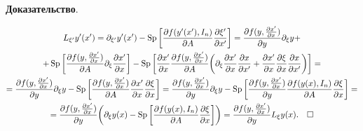 {\bf Доказательство}.


\begin{gather*}


L_{\xi'}y'(x')=\partial_{\xi'}y'(x')-


\SP\bigg[\frac{\partial f(y'(x'),I_n)}{\partial A}


\frac{\partial \xi'}{\partial x'}\bigg] =


\frac{\partial f(y,\frac{\partial x'}{\partial x})}{\partial y}


\partial_\xi y+ \\


%


+\SP\bigg[\frac{\partial f(y,\frac{\partial x'}{\partial x})}{\partial A}


\partial_\xi\frac{\partial x'}{\partial x}\bigg]-


\SP\bigg[ \frac{\partial x'}{\partial x}


\frac{\partial f(y,\frac{\partial x'}{\partial x})}{\partial A}


\bigg(\partial_\xi\frac{\partial x'}{\partial x}


\frac{\partial x}{\partial x'}+\frac{\partial x'}{\partial x}


\frac{\partial\xi}{\partial x}\frac{\partial x}{\partial x'}\bigg)\bigg]=\\


%


=\frac{\partial f(y,\frac{\partial x'}{\partial x})}{\partial y}


\partial_\xi y-


\SP\bigg[ \frac{\partial f(y,\frac{\partial x'}{\partial x})}


{\partial A}


\frac{\partial x'}{\partial x}\frac{\partial\xi}{\partial x}\bigg]= 


\frac{\partial f(y,\frac{\partial x'}{\partial x})}{\partial y}


\partial_\xi y-


\SP\bigg[ \frac{\partial f(y,\frac{\partial x'}{\partial x})}


{\partial y}\frac{\partial f(y(x),I_n)}{\partial A}


\frac{\partial\xi}{\partial x}\bigg]= \\


%


= \frac{\partial f(y,\frac{\partial x'}{\partial x})}{\partial y}


\bigg(\partial_{\xi}y(x)-


\SP\bigg[\frac{\partial f(y(x),I_n)}{\partial A}


\frac{\partial \xi}{\partial x}\bigg]\bigg) =


\frac{\partial f(y,\frac{\partial x'}{\partial x})}{\partial y}


L_\xi y(x).\quad\square


\end{gather*}





